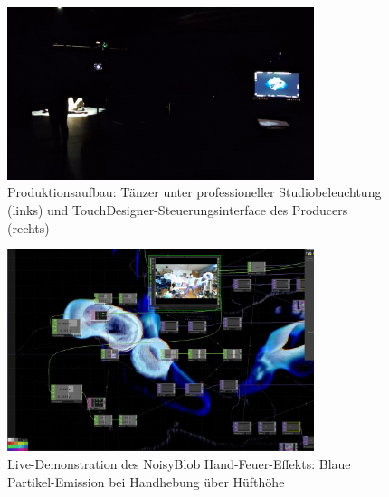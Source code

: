 \begin{figure}[htbp]
    \centering
    \includegraphics[width=0.8\textwidth,height=0.4\textheight,keepaspectratio]{images/BehindTheScenesTopDownWithDancerOnTheLeftInsideTheHeavyLightAndProducerViewOnRightSide.png}
    \caption{Produktionsaufbau: Tänzer unter professioneller Studiobeleuchtung (links) und TouchDesigner-Steuerungsinterface des Producers (rechts)}
    \label{fig:bts_topdown_splitview}
\end{figure}


\begin{figure}[htbp]
    \centering
    \includegraphics[width=0.8\textwidth,height=0.4\textheight,keepaspectratio]{images/DemonstrationOfTheMagicalFireHands.png}
    \caption{Live-Demonstration des NoisyBlob Hand-Feuer-Effekts: Blaue Partikel-Emission bei Handhebung über Hüfthöhe}
    \label{fig:handfeuer_demonstration}
\end{figure}


